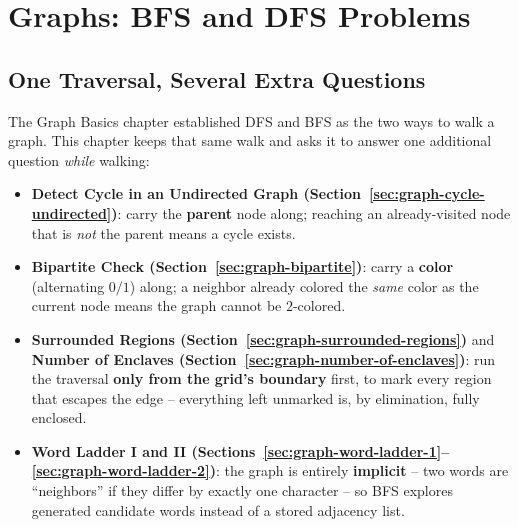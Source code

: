 \chapter{Graphs: BFS and DFS Problems}

\section{One Traversal, Several Extra Questions}
\label{sec:graph-bfs-dfs-intro}

The Graph Basics chapter established DFS and BFS as the two ways to
walk a graph. This chapter keeps that same walk and asks it to answer
one additional question \emph{while} walking:

\begin{patternbox}
\begin{itemize}
  \item \textbf{Detect Cycle in an Undirected Graph (Section~\ref{sec:graph-cycle-undirected})}:
        carry the \textbf{parent} node along; reaching an already-visited
        node that is \emph{not} the parent means a cycle exists.
  \item \textbf{Bipartite Check (Section~\ref{sec:graph-bipartite})}:
        carry a \textbf{color} (alternating $0/1$) along; a neighbor
        already colored the \emph{same} color as the current node means
        the graph cannot be $2$-colored.
  \item \textbf{Surrounded Regions (Section~\ref{sec:graph-surrounded-regions})}
        and \textbf{Number of Enclaves (Section~\ref{sec:graph-number-of-enclaves})}:
        run the traversal \textbf{only from the grid's boundary} first,
        to mark every region that escapes the edge -- everything left
        unmarked is, by elimination, fully enclosed.
  \item \textbf{Word Ladder I and II (Sections~\ref{sec:graph-word-ladder-1}--\ref{sec:graph-word-ladder-2})}:
        the graph is entirely \textbf{implicit} -- two words are
        ``neighbors'' if they differ by exactly one character -- so BFS
        explores generated candidate words instead of a stored
        adjacency list.
\end{itemize}
\end{patternbox}

\newpage







